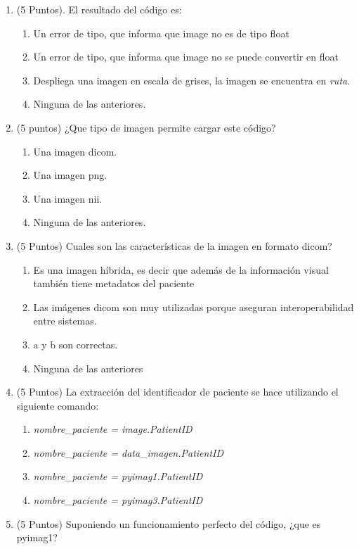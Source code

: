 \documentclass[12pt,a4paper]{article}
\providecommand{\tightlist}{%
  \setlength{\itemsep}{0pt}\setlength{\parskip}{0pt}}\usepackage{longtable,booktabs,array}
\providecommand{\tightlist}{%
  \setlength{\itemsep}{0pt}\setlength{\parskip}{2pt}}
\begin{document}
\begin{enumerate}
\tightlist
\item
  (5 Puntos). El resultado del código es:

  \begin{enumerate}
  \tightlist
  \item
    Un error de tipo, que informa que image no es de tipo float
  \item
    Un error de tipo, que informa que image no se puede convertir en
    float
  \item
    Despliega una imagen en escala de grises, la imagen se encuentra en
    \emph{ruta}.
  \item
    Ninguna de las anteriores.
  \end{enumerate}
\item
  (5 puntos) ¿Que tipo de imagen permite cargar este código?

  \begin{enumerate}
  \tightlist
  \item
    Una imagen dicom.
  \item
    Una imagen png.
  \item
    Una imagen nii.
  \item
    Ninguna de las anteriores.
  \end{enumerate}
\item
  (5 Puntos) Cuales son las características de la imagen en formato
  dicom?

  \begin{enumerate}
  \tightlist
  \item
    Es una imagen híbrida, es decir que además de la información visual
    también tiene metadatos del paciente
  \item
    Las imágenes dicom son muy utilizadas porque aseguran
    interoperabilidad entre sistemas.
  \item
    a y b son correctas.
  \item
    Ninguna de las anteriores
  \end{enumerate}
\item
  (5 Puntos) La extracción del identificador de paciente se hace
  utilizando el siguiente comando:

  \begin{enumerate}
  \tightlist
  \item
    \emph{nombre\_paciente = image.PatientID}
  \item
    \emph{nombre\_paciente = data\_imagen.PatientID}
  \item
    \emph{nombre\_paciente = pyimag1.PatientID}
  \item
    \emph{nombre\_paciente = pyimag3.PatientID}
  \end{enumerate}
\item
  (5 Puntos) Suponiendo un funcionamiento perfecto del código, ¿que es
  pyimag1?


\end{enumerate}
\end{document}

